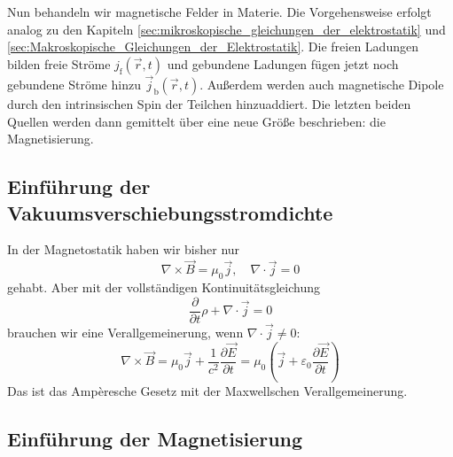 Nun behandeln wir magnetische Felder in Materie. Die Vorgehensweise erfolgt analog zu den Kapiteln \ref{sec:mikroskopische_gleichungen_der_elektrostatik} und \ref{sec:Makroskopische_Gleichungen_der_Elektrostatik}. Die freien Ladungen bilden freie Ströme $j_{\mathrm{f}}\left(\vec {r},t\right)$ und gebundene Ladungen fügen jetzt noch gebundene Ströme hinzu $\vec {j}_{\mathrm{b}}\left(\vec {r},t\right)$. Außerdem werden auch magnetische Dipole durch den intrinsischen Spin der Teilchen hinzuaddiert. Die letzten beiden Quellen werden dann gemittelt über eine neue Größe beschrieben: die Magnetisierung.

\subsection{Einführung der Vakuumsverschiebungsstromdichte}

In der Magnetostatik haben wir bisher nur
\begin{equation*}
	\nabla \times \vec {B}=\mu _{0}\vec {j},\quad\nabla \cdot \vec {j}=0
\end{equation*}
gehabt. Aber mit der vollständigen Kontinuitätsgleichung
\begin{equation*}
	\frac{\partial }{\partial t}\rho +\nabla \cdot \vec {j}=0
\end{equation*}
brauchen wir eine Verallgemeinerung, wenn $\nabla \cdot \vec {j}\neq 0$:
\begin{equation*}
	\nabla \times \vec {B}=\mu _{0}\vec {j}+\frac{1}{c^{2}}\frac{\partial \vec {E}}{\partial t}=\mu _{0}\left(\vec {j}+\varepsilon _{0}\frac{\partial \vec {E}}{\partial t}\right)
\end{equation*}
Das ist das Ampèresche Gesetz mit der Maxwellschen Verallgemeinerung.

\subsection{Einführung der Magnetisierung}

